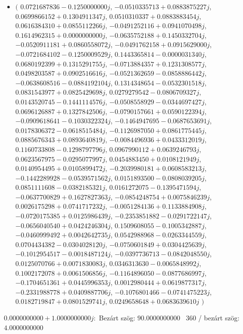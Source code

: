 \documentclass[14pt,a4paper]{article}
\begin{document}
\begin{itemize}
\item
$\big($
$0.0721687836-0.1250000000j$, $-0.0510335713+0.0883875227j$, $0.0699866152+0.1304911347j$, $0.0510310337+0.0883883454j$, $0.0616384310+0.0855112266j$, $-0.0491252116+0.0941070498j$, $0.1614962315+0.0000000000j$, $-0.0635752188+0.1450332704j$, $-0.0520911181+0.0860558072j$, $-0.0491762158+0.0915629000j$, $-0.0721684102-0.1250009529j$, $0.1443365814-0.0000031340j$, $0.0680192399+0.1315291755j$, $-0.0713884357+0.1231308577j$, $0.0498203587+0.0902516616j$, $-0.0521362659-0.0858886442j$, $-0.0638608516-0.0884192104j$, $0.1314348654-0.0532301518j$, $0.0831543977+0.0825429698j$, $0.0279279542-0.0806709327j$, $0.0143520745-0.1441114576j$, $-0.0508558929-0.0344697427j$, $0.0696126887+0.1327842506j$, $-0.0790157661+0.0590122394j$, $-0.0909618641-0.1030322324j$, $-0.1464947695-0.0687653691j$, $0.0178306372-0.0618515484j$, $-0.1126987050+0.0861775445j$, $0.0885676343+0.0893640819j$, $-0.0084496936+0.0433312019j$, $0.1160733808-0.1298797796j$, $0.0967990112+0.0639246793j$, $0.0623567975-0.0295077997j$, $0.0454883450+0.0108121949j$, $0.0140954495+0.0105899472j$, $-0.2039980181+0.0608583213j$, $-0.1442289928-0.0539571562j$, $0.0151893500-0.0808039205j$, $0.0851111608-0.0382185321j$, $0.0161272075-0.1395471594j$, $-0.0637700829+0.1627827363j$, $-0.0854248754+0.0075846239j$, $0.0026175298+0.0741717232j$, $-0.0051284136+0.1133884908j$, $-0.0720175385+0.0125986439j$, $-0.2353851882-0.0291722147j$, $-0.0656040540+0.0424246304j$, $0.1509608055-0.1005342887j$, $-0.0460999492+0.0042642735j$, $0.0542988968-0.0263344559j$, $0.0704434382-0.0304028120j$, $-0.0750601849+0.0304425639j$, $-0.1012954517-0.0018487124j$, $-0.0397736713-0.0842048550j$, $0.0125070766+0.0071830083j$, $0.0346313630-0.0065848992j$, $0.1002172078+0.0061506856j$, $-0.1164896050-0.0877686997j$, $-0.1704651361+0.0445996353j$, $0.0012980444+0.0619877317j$, $-0.2331988778+0.0409887706j$, $-0.1076801466-0.0741475223j$, $0.0182719847+0.0801529741j$, $0.0249658648+0.0683639610j$
$\big)$
\end{itemize}
$0.0000000000+1.0000000000j$:\
Bezárt szög: $90.0000000000$ \
360 / bezárt szög: $4.0000000000$\
\end{document}
